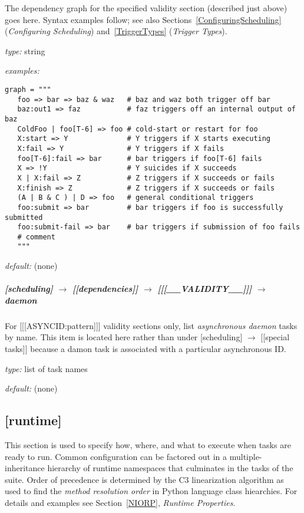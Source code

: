 The dependency graph for the specified validity section (described just
above) goes here. Syntax examples follow; see also
Sections~\ref{ConfiguringScheduling} ({\em Configuring Scheduling})
and~\ref{TriggerTypes} ({\em Trigger Types}). 

\begin{myitemize}
\item {\em type:} string 
\item {\em examples:}
  \begin{lstlisting}
graph = """
   foo => bar => baz & waz   # baz and waz both trigger off bar
   baz:out1 => faz           # faz triggers off an internal output of baz
   ColdFoo | foo[T-6] => foo # cold-start or restart for foo
   X:start => Y              # Y triggers if X starts executing
   X:fail => Y               # Y triggers if X fails
   foo[T-6]:fail => bar      # bar triggers if foo[T-6] fails
   X => !Y                   # Y suicides if X succeeds
   X | X:fail => Z           # Z triggers if X succeeds or fails
   X:finish => Z             # Z triggers if X succeeds or fails
   (A | B & C ) | D => foo   # general conditional triggers
   foo:submit => bar         # bar triggers if foo is successfully submitted
   foo:submit-fail => bar    # bar triggers if submission of foo fails
   # comment
   """
  \end{lstlisting}
\item {\em default:} (none)
\end{myitemize}

\subparagraph[daemon]{[scheduling] $\rightarrow$ [[dependencies]] $\rightarrow$ [[[\_\_VALIDITY\_\_]]] $\rightarrow$ daemon }

For [[[ASYNCID:pattern]]] validity sections only, list 
{\em asynchronous daemon} tasks by name. This item is located here rather than
under [scheduling] $\rightarrow$ [[special tasks]] because a damon task
is associated with a particular asynchronous ID.

\begin{myitemize}
\item {\em type:} list of task names
\item {\em default:} (none)
\end{myitemize}

\subsection{[runtime]}

This section is used to specify how, where, and what to execute when
tasks are ready to run. Common
configuration can be factored out in a multiple-inheritance hierarchy of
runtime namespaces that culminates in the tasks of the suite. Order of
precedence is determined by the C3 linearization algorithm as used to
find the {\em method resolution order} in Python language class
hiearchies. For details and examples see Section~\ref{NIORP}, {\em
Runtime Properties}.

